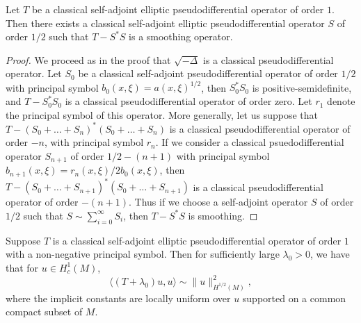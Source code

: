 \begin{lemma}
    Let $T$ be a classical self-adjoint elliptic pseudodifferential operator of order $1$. Then there exists a classical self-adjoint elliptic pseudodifferential operator $S$ of order $1/2$ such that $T - S^* S$ is a smoothing operator.
\end{lemma}
\begin{proof}
    We proceed as in the proof that $\sqrt{-\Delta}$ is a classical pseudodifferential operator. Let $S_0$ be a classical self-adjoint pseudodifferential operator of order $1/2$ with principal symbol $b_0(x,\xi) = a(x,\xi)^{1/2}$, then $S_0^* S_0$ is positive-semidefinite, and $T - S_0^* S_0$ is a classical pseudodifferential operator of order zero. Let $r_1$ denote the principal symbol of this operator. More generally, let us suppose that $T - (S_0 + \dots + S_n)^* (S_0 + \dots + S_n)$ is a classical pseudodifferential operator of order $-n$, with principal symbol $r_n$. If we consider a classical psuedodifferential operator $S_{n+1}$ of order $1/2 - (n+1)$ with principal symbol $b_{n+1}(x,\xi) = r_n(x,\xi) / 2 b_0(x,\xi)$, then $T - (S_0 + \dots + S_{n+1})^* (S_0 + \dots + S_{n+1})$ is a classical pseudodifferential operator of order $-(n+1)$. Thus if we choose a self-adjoint operator $S$ of order $1/2$ such that $S \sim \sum_{i = 0}^\infty S_i$, then $T - S^* S$ is smoothing. 
\end{proof}

\begin{lemma}
    Suppose $T$ is a classical self-adjoint elliptic pseudodifferential operator of order $1$ with a non-negative principal symbol. Then for sufficiently large $\lambda_0 > 0$, we have that for $u \in H^1_c(M)$,
    \[ \langle (T + \lambda_0) u, u \rangle \sim \| u \|_{H^{1/2}(M)}^2, \]
    where the implicit constants are locally uniform over $u$ supported on a common compact subset of $M$.
\end{lemma}

